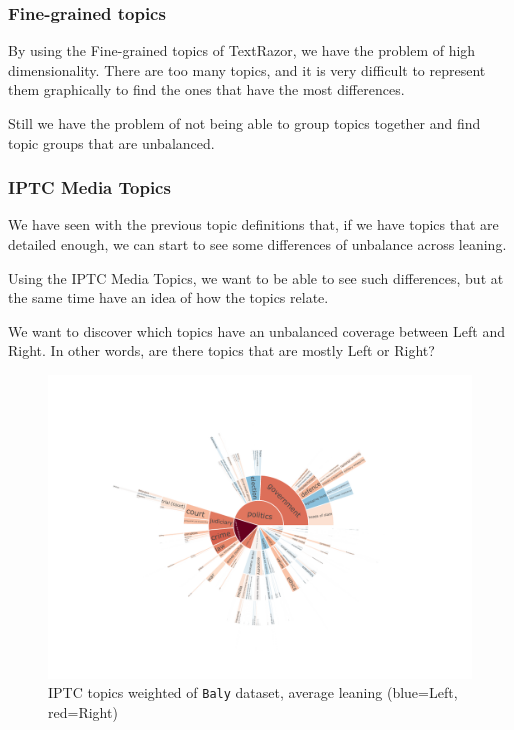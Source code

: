\subsubsection{\statusred Fine-grained topics}

By using the Fine-grained topics of TextRazor, we have the problem of high dimensionality. There are too many topics, and it is very difficult to represent them graphically to find the ones that have the most differences.



Still we have the problem of not being able to group topics together and find topic groups that are unbalanced.

\subsubsection{\statusgreen IPTC Media Topics}

We have seen with the previous topic definitions that, if we have topics that are detailed enough, we can start to see some differences of unbalance across leaning.

Using the IPTC Media Topics, we want to be able to see such differences, but at the same time have an idea of how the topics relate.

We want to discover which topics have an unbalanced coverage between Left and Right. In other words, are there topics that are mostly Left or Right?


\begin{figure}[!htbp]
    \centering
    \includegraphics[trim={2.2cm 2cm 2.2cm 2cm},clip,width=\linewidth]{figures/baly_iptc_weighted_by_leaning.pdf}
    \caption{IPTC topics weighted of \texttt{Baly} dataset, average leaning (blue=Left, red=Right)}
    \label{fig:baly_iptc_weighted_by_leaning}
\end{figure}

